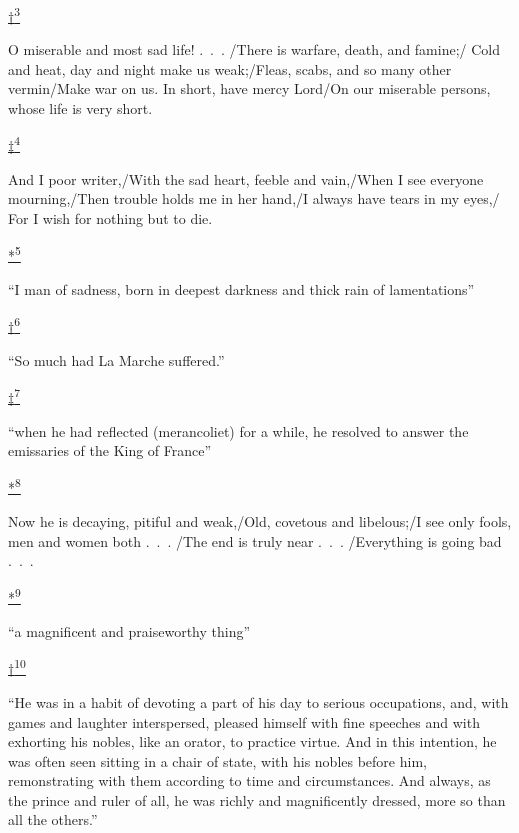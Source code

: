 \protect\hypertarget{23_NOTES.xhtmlux5cux23id_2416}{\protect\hyperlink{09_Chapter_Two__THE_CRAVING_FOR_A_M.xhtmlux5cux23id_2415}{†\textsuperscript{3}}}
O miserable and most sad life! .~.~. /There is warfare, death, and
famine;/ Cold and heat, day and night make us weak;/Fleas, scabs, and so
many other vermin/Make war on us. In short, have mercy Lord/On our
miserable persons, whose life is very short.

\protect\hypertarget{23_NOTES.xhtmlux5cux23id_2418}{\protect\hyperlink{09_Chapter_Two__THE_CRAVING_FOR_A_M.xhtmlux5cux23id_2417}{‡\textsuperscript{4}}}
And I poor writer,/With the sad heart, feeble and vain,/When I see
everyone mourning,/Then trouble holds me in her hand,/I always have
tears in my eyes,/ For I wish for nothing but to die.

\protect\hypertarget{23_NOTES.xhtmlux5cux23id_2420}{\protect\hyperlink{09_Chapter_Two__THE_CRAVING_FOR_A_M.xhtmlux5cux23id_2419}{*\textsuperscript{5}}}
``I man of sadness, born in deepest darkness and thick rain of
lamentations''

\protect\hypertarget{23_NOTES.xhtmlux5cux23id_2422}{\protect\hyperlink{09_Chapter_Two__THE_CRAVING_FOR_A_M.xhtmlux5cux23id_2421}{†\textsuperscript{6}}}
``So much had La Marche suffered.''

\protect\hypertarget{23_NOTES.xhtmlux5cux23id_2424}{\protect\hyperlink{09_Chapter_Two__THE_CRAVING_FOR_A_M.xhtmlux5cux23id_2423}{‡\textsuperscript{7}}}
``when he had reflected (merancoliet) for a while, he resolved to answer
the emissaries of the King of France''

\protect\hypertarget{23_NOTES.xhtmlux5cux23id_2426}{\protect\hyperlink{09_Chapter_Two__THE_CRAVING_FOR_A_M.xhtmlux5cux23id_2425}{*\textsuperscript{8}}}
Now he is decaying, pitiful and weak,/Old, covetous and libelous;/I see
only fools, men and women both .~.~. /The end is truly near .~.~.
/Everything is going bad .~.~.

\protect\hypertarget{23_NOTES.xhtmlux5cux23id_2428}{\protect\hyperlink{09_Chapter_Two__THE_CRAVING_FOR_A_M.xhtmlux5cux23id_2427}{*\textsuperscript{9}}}
``a magnificent and praiseworthy thing''

\protect\hypertarget{23_NOTES.xhtmlux5cux23id_2430}{\protect\hyperlink{09_Chapter_Two__THE_CRAVING_FOR_A_M.xhtmlux5cux23id_2429}{†\textsuperscript{10}}}
``He was in a habit of devoting a part of his day to serious
occupations, and, with games and laughter interspersed, pleased himself
with fine speeches and with exhorting his nobles, like an orator, to
practice virtue. And in this intention, he was often seen sitting in a
chair of state, with his nobles before him, remonstrating with them
according to time and circumstances. And always, as the prince and ruler
of all, he was richly and magnificently dressed, more so than all the
others.''

